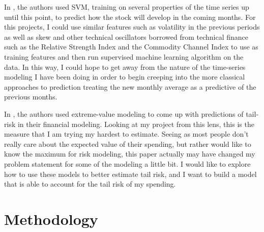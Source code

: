 \documentclass[11pt,a4paper]{article}
\newenvironment{updatematerial}{
\color{blue}
}{

}
\begin{document}
\begin{updatematerial}
	In \cite{SVMFinance}, the authors used SVM, training on several properties of the time series up until this point, to predict how the stock will develop in the coming months. For this projects, I could use similar features such as volatility in the previous periods as well as skew and other technical oscillators borrowed from technical finance such as the Relative Strength Index and the Commodity Channel Index to use as training features and then run supervised machine learning algorithm on the data. In this way, I could hope to get away from the nature of the time-series modeling I have been doing in order to begin creeping into the more classical approaches to prediction treating the new monthly average as a predictive of the previous months. 
	
	In \cite{LongTail}, the authors used extreme-value modeling to come up with predictions of tail-risk in their financial modeling. Looking at my project from this lens, this is the measure that I am trying my hardest to estimate. Seeing as most people don't really care about the expected value of their spending, but rather would like to know the maximum for risk modeling, this paper actually may have changed my problem statement for some of the modeling a little bit. I would like to explore how to use these models to better estimate tail risk, and I want to build a model that is able to account for the tail risk of my spending. 
\end{updatematerial}


\section{Methodology}
\end{document}
